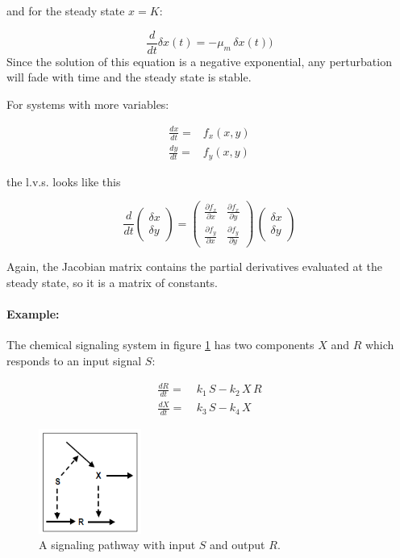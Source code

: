 \documentclass[12pt]{article}
\begin{document}
and for the steady state $x=K$:

 \begin{equation}
	\frac{d}{dt}\delta x(t)  = -  \mu_m \,  \delta x(t))  \nonumber
\end{equation}Since the solution of this equation is a negative exponential, any perturbation will fade with time and the steady state is stable.

For systems with more variables:

\begin{align}
	\frac{dx}{dt}=&f_x(x,y)  \nonumber\\
	\frac{dy}{dt}=&f_y(x,y)  \nonumber
\end{align}

the l.v.s. looks like this

 \begin{equation}
 	\label{fig:svlnvar}
	\frac{d}{dt} \begin{pmatrix} \delta x\\ \delta y \end{pmatrix}= \begin{pmatrix} \frac{\partial f_x}{\partial x} & \frac{\partial f_x}{\partial y}\\ \frac{\partial f_y}{\partial x} & \frac{\partial f_y}{\partial y} \end{pmatrix} \, \begin{pmatrix} \delta x\\ \delta y \end{pmatrix}
\end{equation}

Again, the Jacobian matrix contains the partial derivatives evaluated at the steady state, so it is a matrix of constants.

\paragraph{Example:} The chemical signaling system in figure \ref{fig:signalpathd} has two components $X$ and $R$ which responds to an input signal $S$:

\begin{align}
	\frac{dR}{dt} =&\: k_1 \, S - k_2 \, X \, R  \nonumber\\
	\frac{dX}{dt} =&\: k_3 \, S - k_4 \, X  \nonumber
\end{align}

\begin{figure}
	\begin{center}
		\includegraphics[width=0.3\textwidth]{signalpathd}
	\end{center}
	\caption{A signaling pathway with input $S$ and output $R$. }
	\label{fig:signalpathd}
\end{figure}
\end{document}
